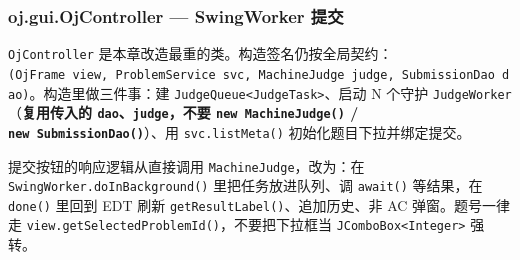 \documentclass[
  11pt,
]{ctexart}
\begin{document}
\hypertarget{oj.gui.ojcontroller-swingworker-ux63d0ux4ea4}{%
\subsubsection{oj.gui.OjController --- SwingWorker
提交}\label{oj.gui.ojcontroller-swingworker-ux63d0ux4ea4}}

\texttt{OjController}
是本章改造最重的类。构造签名仍按全局契约：\texttt{(OjFrame\ view,\ ProblemService\ svc,\ MachineJudge\ judge,\ SubmissionDao\ dao)}。构造里做三件事：建
\texttt{JudgeQueue\textless{}JudgeTask\textgreater{}}、启动 N 个守护
\texttt{JudgeWorker}（\textbf{复用传入的
\texttt{dao}、\texttt{judge}，不要 \texttt{new\ MachineJudge()} /
\texttt{new\ SubmissionDao()}}）、用 \texttt{svc.listMeta()}
初始化题目下拉并绑定提交。

提交按钮的响应逻辑从直接调用 \texttt{MachineJudge}，改为：在
\texttt{SwingWorker.doInBackground()} 里把任务放进队列、调
\texttt{await()} 等结果，在 \texttt{done()} 里回到 EDT 刷新
\texttt{getResultLabel()}、追加历史、非 AC 弹窗。题号一律走
\texttt{view.getSelectedProblemId()}，不要把下拉框当
\texttt{JComboBox\textless{}Integer\textgreater{}} 强转。
\end{document}
